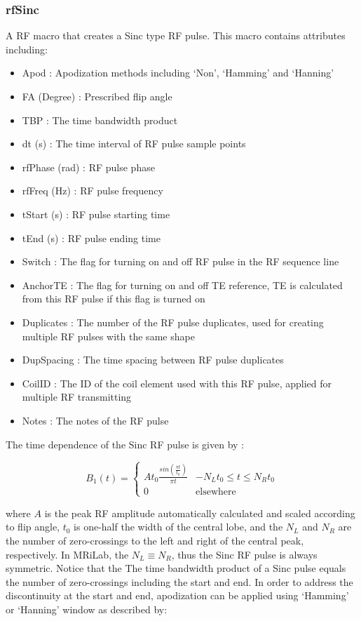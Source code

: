 \documentclass{book}%
\begin{document}
\subsubsection{rfSinc}

A RF macro that creates a Sinc type RF pulse. This macro contains attributes including:

\begin{itemize}
	\item Apod : Apodization methods including `Non', `Hamming' and `Hanning'
	\item FA (Degree) : Prescribed flip angle 
	\item TBP : The time bandwidth product
	\item dt (s) : The time interval of RF pulse sample points
	\item rfPhase (rad) : RF pulse phase
	\item rfFreq (Hz) : RF pulse frequency
	\item tStart (s) : RF pulse starting time
	\item tEnd (s) : RF pulse ending time
	\item Switch : The flag for turning on and off RF pulse in the RF sequence line
	\item AnchorTE : The flag for turning on and off TE reference, TE is calculated from this RF pulse if this flag is turned on
	\item Duplicates : The number of the RF pulse duplicates, used for creating multiple RF pulses with the same shape
	\item DupSpacing : The time spacing between RF pulse duplicates
	\item CoilID : The ID of the coil element used with this RF pulse, applied for multiple RF transmitting
	\item Notes : The notes of the RF pulse 
\end{itemize}

The time dependence of the Sinc RF pulse is given by \cite{Handbook2004}:

\begin{equation}
B_1(t) = 
\begin{cases}
 A t_0 \frac{sin(\frac{\pi t}{t_0})}{\pi t} &  -N_L t_0 \leq t \leq N_R t_0 \\
 0                                          &  \text{elsewhere}
\end{cases}
\label{eq:Sinc}
\end{equation}

where $A$ is the peak RF amplitude automatically calculated and scaled according to flip angle, $t_0$ is one-half the width of the central lobe, and the $N_L$ and $N_R$ are the number of zero-crossings to the left and right of the central peak, respectively. In MRiLab, the $N_L \equiv N_R$, thus the Sinc RF pulse is always symmetric. Notice that the The time bandwidth product of a Sinc pulse equals the number of zero-crossings including the start and end. In order to address the discontinuity at the start and end, apodization can be applied using `Hamming' or `Hanning' window as described by:
\end{document}
